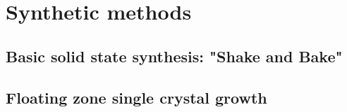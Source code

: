 \chapter{Synthetic methods} \label{chap:chap-3}





\section{Basic solid state synthesis: "Shake and Bake"}

\section{Floating zone single crystal growth}

